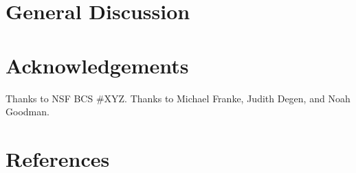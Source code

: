 \documentclass[10pt, letterpaper]{article}
\begin{document}
\section{General Discussion}\label{general-discussion}

\section{Acknowledgements}\label{acknowledgements}

Thanks to NSF BCS \#XYZ. Thanks to Michael Franke, Judith Degen, and
Noah Goodman.

\section{References}\label{references}

\setlength{\parindent}{-0.1in} \setlength{\leftskip}{0.125in} \noindent
\end{document}
